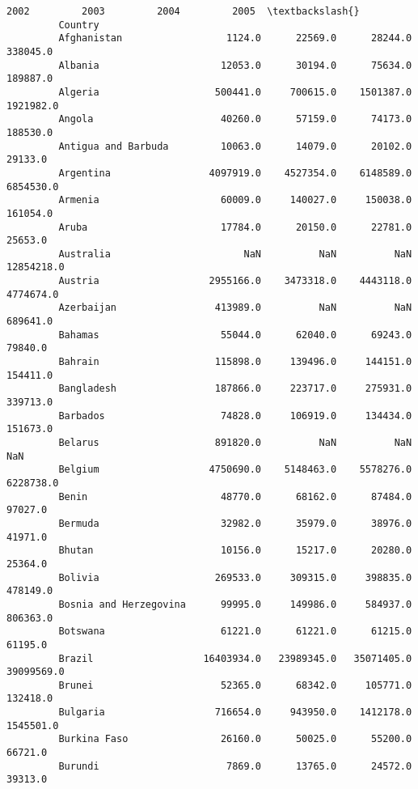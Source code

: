 \documentclass[11pt]{article}
\begin{document}
\begin{Verbatim}[commandchars=\\\{\}]
                                        2002         2003         2004         2005  \textbackslash{}
         Country                                                                      
         Afghanistan                  1124.0      22569.0      28244.0     338045.0   
         Albania                     12053.0      30194.0      75634.0     189887.0   
         Algeria                    500441.0     700615.0    1501387.0    1921982.0   
         Angola                      40260.0      57159.0      74173.0     188530.0   
         Antigua and Barbuda         10063.0      14079.0      20102.0      29133.0   
         Argentina                 4097919.0    4527354.0    6148589.0    6854530.0   
         Armenia                     60009.0     140027.0     150038.0     161054.0   
         Aruba                       17784.0      20150.0      22781.0      25653.0   
         Australia                       NaN          NaN          NaN   12854218.0   
         Austria                   2955166.0    3473318.0    4443118.0    4774674.0   
         Azerbaijan                 413989.0          NaN          NaN     689641.0   
         Bahamas                     55044.0      62040.0      69243.0      79840.0   
         Bahrain                    115898.0     139496.0     144151.0     154411.0   
         Bangladesh                 187866.0     223717.0     275931.0     339713.0   
         Barbados                    74828.0     106919.0     134434.0     151673.0   
         Belarus                    891820.0          NaN          NaN          NaN   
         Belgium                   4750690.0    5148463.0    5578276.0    6228738.0   
         Benin                       48770.0      68162.0      87484.0      97027.0   
         Bermuda                     32982.0      35979.0      38976.0      41971.0   
         Bhutan                      10156.0      15217.0      20280.0      25364.0   
         Bolivia                    269533.0     309315.0     398835.0     478149.0   
         Bosnia and Herzegovina      99995.0     149986.0     584937.0     806363.0   
         Botswana                    61221.0      61221.0      61215.0      61195.0   
         Brazil                   16403934.0   23989345.0   35071405.0   39099569.0   
         Brunei                      52365.0      68342.0     105771.0     132418.0   
         Bulgaria                   716654.0     943950.0    1412178.0    1545501.0   
         Burkina Faso                26160.0      50025.0      55200.0      66721.0   
         Burundi                      7869.0      13765.0      24572.0      39313.0   

\end{Verbatim}
\end{document}
